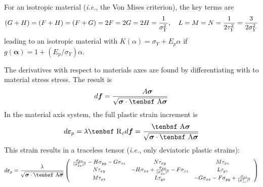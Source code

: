 \documentclass[11pt]{book}
\renewcommand{\vec}[1]{\boldsymbol{#1}}
\def\A{\hbox{\tenbsf A}}
\def\dpl{d \vec{\varepsilon}_{p}}
\def\df{d \vec{f}}
\def\R{\hbox{\tenbsf R}}
\def\s#1{\sigma_{#1}}
\def\t#1{\tau_{#1}}
\begin{document}
For an isotropic material ({\em i.e.}, the Von Mises criterion), the key terms are
\begin{equation}
   (G+H) = (F+H) = (F+G) = 2F = 2G = 2H = {1\over \sigma_Y^2}, \quad L=M=N = {1\over 2\tau_Y^2} = {3\over 2\sigma_Y^2}
\end{equation}
leading to an isotropic material with $K(\alpha)=\sigma_Y + E_p\alpha$ if $g(\vec\alpha) = 1 + (E_p/\sigma_Y)\alpha$.

The derivatives with respect to materials axes are found by differentiating with to material stress stress. The result is
\begin{equation}
         \df = {\\A {\vec\sigma}\over\sqrt{{\vec\sigma} \cdot \A {\vec\sigma}}} \end{equation}
In the material axis system, the full plastic strain increment is
\begin{equation}
       {\dpl} = \lambda \R_\varepsilon\df = {\A {\vec\sigma}\over\sqrt{{\vec\sigma} \cdot \A {\vec\sigma}}}
\end{equation}
This strain results in a traceless tensor ({\em i.e.}, only deviatoric plastic strains):
\begin{equation}
         \dpl = {\lambda\over \sqrt{{\vec\sigma} \cdot \A \overline{\vec\sigma}}}
         \left( \begin{array}{ccc}
                      {{\s{xx}}\over (\s{xx}^Y)^2} - H{\s{yy}} - G{\s{zz}} & N{\t{xy}} & M{\t{xz}} \\
                       N{\t{xy}} & -H{\s{xx}} + {{\s{yy}}\over (\s{yy}^Y)^2} - F{\s{zz}} & L{\t{yz}}  \\
                       M{\t{xz}} & L{\t{yz}} & -G{\s{xx}} -F{\s{yy}} +{{\s{zz}}\over (\s{zz}^Y)^2} 
                        \end{array} \right)
\end{equation}
\end{document}
